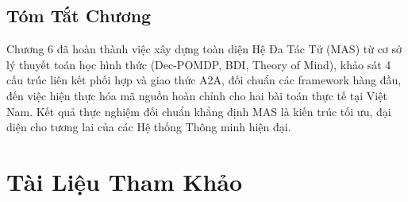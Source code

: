\documentclass[12pt,a4paper]{report}
\begin{document}
\section{Tóm Tắt Chương}
Chương 6 đã hoàn thành việc xây dựng toàn diện Hệ Đa Tác Tử (MAS) từ cơ sở lý thuyết toán học hình thức (Dec-POMDP, BDI, Theory of Mind), khảo sát 4 cấu trúc liên kết phối hợp và giao thức A2A, đối chuẩn các framework hàng đầu, đến việc hiện thực hóa mã nguồn hoàn chỉnh cho hai bài toán thực tế tại Việt Nam. Kết quả thực nghiệm đối chuẩn khẳng định MAS là kiến trúc tối ưu, đại diện cho tương lai của các Hệ thống Thông minh hiện đại.


\chapter*{Tài Liệu Tham Khảo}
\end{document}
